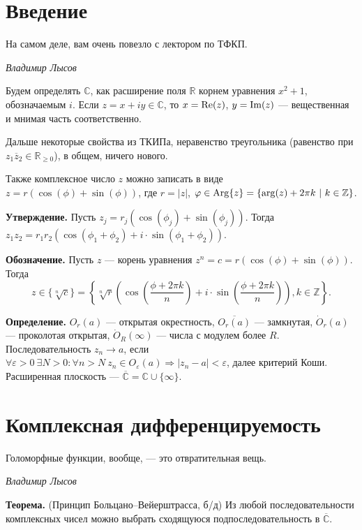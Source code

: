 \section{Введение}
\epigraph{На самом деле, вам очень повезло с лектором по ТФКП.}{\textit{Владимир Лысов}}

Будем определять $\mathbb C$, как расширение поля $\mathbb R$ корнем уравнения $x^2 + 1$, обозначаемым $i$.
Если $z = x + iy \in \mathbb C$, то $x = \operatorname{Re}(z)$, $y = \operatorname{Im}(z)$ --- вещественная и мнимая часть соответственно.

Дальше некоторые свойства из ТКИПа, неравенство треугольника (равенство при $z_1 \overline z_2 \in \mathbb R_{\ge 0}$), в общем, ничего нового.

Также комплексное число $z$ можно записать в виде $z = r(\cos(\phi) + \sin(\phi))$, где $r = |z|$, $\varphi \in \operatorname{Arg}\{z\} = \{\arg(z) + 2\pi k~|~k \in \mathbb Z\}$.

\textbf{Утверждение.} Пусть $z_j = r_j (\cos(\phi_j) + \sin(\phi_j))$.
Тогда $z_1z_2 = r_1r_2(\cos(\phi_1 + \phi_2) + i \cdot \sin(\phi_1 + \phi_2))$.

\textbf{Обозначение.} Пусть $z$ --- корень уравнения $z^n = c = r(\cos(\phi) + \sin(\phi))$.
Тогда 
\[
    z \in \{\sqrt[n]{c}\} = \left\{\sqrt[n]{r} \left( \cos \left( \frac{\phi + 2\pi k}{n} \right) + i \cdot \sin \left( \frac{\phi + 2 \pi k}{n} \right) \right), k \in \mathbb Z \right\}.
\]

\textbf{Определение.} $O_r(a)$ --- открытая окрестность, $\overline{O_r(a)}$ --- замкнутая, $\dot O_r(a)$ --- проколотая открытая, $\dot O_R(\infty)$ --- числа с модулем более $R$.
Последовательность $z_n \to a$, если $\forall \varepsilon > 0~\exists N > 0: \forall n > N~z_n \in O_\varepsilon(a) \Rightarrow |z_n - a| < \varepsilon$, далее критерий Коши.
Расширенная плоскость --- $\overline{\mathbb C} = \mathbb C \cup \{\infty\}$.

\section{Комплексная дифференцируемость}
\epigraph{Голоморфные функции, вообще, — это отвратительная вещь.}{\textit{Владимир Лысов}}

\textbf{Теорема.} (Принцип Больцано--Вейерштрасса, б/д) Из любой последовательности комплексных чисел можно выбрать сходящуюся подпоследовательность в $\overline{\mathbb C}$.


